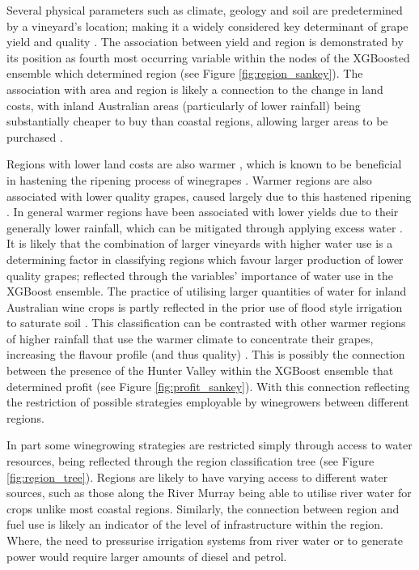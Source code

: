 \documentclass[review,12pt,authoryear]{elsarticle}
\begin{document}
\begin{linenumbers}
Several physical parameters such as climate, geology and soil are predetermined by a vineyard's location; making it a widely considered key determinant of grape yield and quality \citep{abbalDecisionSupportSystem2016,agostaRegionalClimateVariability2012,fragaMultivariateClusteringViticultural2017}. The association between yield and region is demonstrated by its position as fourth most occurring variable within the nodes of the XGBoosted ensemble which determined region (see Figure \ref{fig:region_sankey}). The association with area and region is likely a connection to the change in land costs, with inland Australian areas (particularly of lower rainfall) being substantially cheaper to buy than coastal regions, allowing larger areas to be purchased \citep{willchancellorMeasuringAustralianBroadacre2019}.
\par
Regions with lower land costs are also warmer \citep{willchancellorMeasuringAustralianBroadacre2019}, which is known to be beneficial in hastening the ripening process of winegrapes \citep{webbObservedTrendsWinegrape2011}. Warmer regions are also associated with lower quality grapes, caused largely due to this hastened ripening \citep{botting1996canopy}. In general warmer regions have been associated with lower yields due to their generally lower rainfall, which can be mitigated through applying excess water \citep{campsGrapeHarvestYield2012}. It is likely that the combination of larger vineyards with higher water use is a determining factor in classifying regions which favour larger production of lower quality grapes; reflected through the variables' importance of water use in the XGBoost ensemble. The practice of utilising larger quantities of water for inland Australian wine crops is partly reflected in the prior use of flood style irrigation to saturate soil \citep{bgcoombeGrapeBerryDevelopment2004}. This classification can be contrasted with other warmer regions of higher rainfall that use the warmer climate to concentrate their grapes, increasing the flavour profile (and thus quality) \citep{goodwinijeriepRegulatedDeficitIrrigation1992,mgmccarthyEffectCropLoad1986}. This is possibly the connection between the presence of the Hunter Valley within the XGBoost ensemble that determined profit (see Figure \ref{fig:profit_sankey}). With this connection reflecting the restriction of possible strategies employable by winegrowers between different regions.
\par
In part some winegrowing strategies are restricted simply through access to water resources, being reflected through the region classification tree (see Figure \ref{fig:region_tree}). Regions are likely to have varying access to different water sources, such as those along the River Murray being able to utilise river water for crops unlike most coastal regions. Similarly, the connection between region and fuel use is likely an indicator of the level of infrastructure within the region. Where, the need to pressurise irrigation systems from river water or to generate power would require larger amounts of diesel and petrol.

\end{linenumbers}
\end{document}
